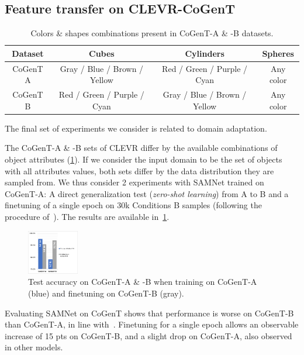\subsection{Feature transfer on CLEVR-CoGenT}
\label{sec:feature}
\begin{table}[ht]
	\label{tab:cogent_conditions}
	\centering
	\begin{adjustbox}{width=0.45\textwidth}
		\begin{tabular}{cccc}
			\toprule
			Dataset	& Cubes	& Cylinders &	Spheres	\\
			\midrule
			CoGenT A & Gray / Blue / Brown / Yellow  & Red / Green / Purple / Cyan	&	Any color  \\
			CoGenT B	&	Red / Green / Purple / Cyan &	Gray / Blue / Brown / Yellow	&	Any color \\
			\bottomrule
		\end{tabular}
	\end{adjustbox}
	\caption{Colors \& shapes combinations present in CoGenT-A \& -B datasets.}
\end{table}

The final set of experiments we consider is related to domain adaptation. %

The CoGenT-A \& -B sets of CLEVR differ by the available combinations of object attributes (\cref{tab:cogent_conditions}). If we consider the input domain to be the set of objects with all attributes values, both sets differ by the data distribution they are sampled from. We thus consider 2 experiments with SAMNet trained on CoGenT-A: A direct generalization test (\emph{zero-shot learning}) from A to B and a finetuning of a single epoch on 30k Conditions B samples (following the procedure of~\cite{johnson2017inferring, mascharka2018transparency, perez2018film, marois2018transfer}). The results are available in~\cref{fig:CoGenT-B-results}.

\begin{figure}[!t]\vspace{5pt}
	\centering
	\includegraphics[width=0.2\textwidth]{img/results/CoGenT_B_results.pdf}
	\caption{Test accuracy on CoGenT-A \& -B when training on CoGenT-A (blue) and finetuning on CoGenT-B (gray).}
	\label{fig:CoGenT-B-results}
\end{figure}
Evaluating SAMNet on CoGenT shows that performance is worse on CoGenT-B than CoGenT-A, in line with~\cite{johnson2017inferring, mascharka2018transparency, perez2018film}. Finetuning for a single epoch allows an observable increase of 15 pts on CoGenT-B, and a slight drop on CoGenT-A, also observed in other models.